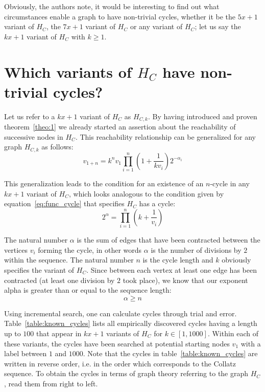 Obviously, the authors note, it would be interesting to find out what circumstances enable a graph to have non-trivial cycles, whether it be the $5x+1$ variant of $H_C$, the $7x+1$ variant of $H_C$ or any variant of $H_C$; let us say the $kx+1$ variant of $H_C$ with $k\geq 1$.

\section{Which variants of \mbox{$H_C$} have non-trivial cycles?}
\label{sec:non_trivial_cycles}
Let us refer to a $kx+1$ variant of $H_C$ as $H_{C,k}$. By having introduced and proven theorem~\ref{theo:1} we already started an assertion about the reachability of successive nodes in $H_C$. This reachability relationship can be generalized for any graph $H_{C,k}$ as follows:
\begin{equation}
\label{eq:generalized_reachability}
v_{1+n}=k^nv_1\prod_{i=1}^{n}\left(1+\frac{1}{kv_{i}}\right)2^{-\alpha_i}
\end{equation}

This generalization leads to the condition for an existence of an $n$-cycle in any $kx+1$ variant of $H_C$, which looks analogous to the condition given by equation~\ref{eq:func_cycle} that specifies $H_C$ has a cycle:
\begin{equation}
\label{eq:generalized_cycle}
2^\alpha=\prod_{i=1}^{n}\left(k+\frac{1}{v_i}\right)
\end{equation}

The natural number $\alpha$ is the sum of edges that have been contracted between the vertices $v_i$ forming the cycle, in other words $\alpha$ is the number of divisions by $2$ within the sequence. The natural number $n$ is the cycle length and $k$ obviously specifies the variant of $H_C$. Since between each vertex at least one edge has been contracted (at least one division by $2$ took place), we know that our exponent alpha is greater than or equal to the sequence length:
\begin{equation}
\label{eq:n_alpha}
	\alpha\ge n
\end{equation}

\par\medskip
Using incremental search, one can calculate cycles through trial and error. Table~\ref{table:known_cycles} lists all empirically discovered cycles having a length up to $100$ that appear in $kx+1$ variants of $H_C$ for $k\in[1,1000]$. Within each of these variants, the cycles have been searched at potential starting nodes $v_1$ with a label between $1$ and $1000$. Note that the cycles in table~\ref{table:known_cycles} are written in reverse order, i.e. in the order which corresponds to the Collatz sequence. To obtain the cycles in terms of graph theory referring to the graph $H_C$, read them from right to left.


